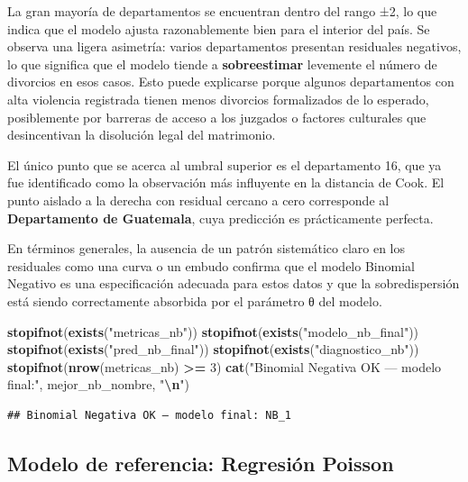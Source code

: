 \documentclass[
]{article}
\newenvironment{Shaded}{\begin{snugshade}}{\end{snugshade}}
\newcommand{\DecValTok}[1]{\textcolor[rgb]{0.00,0.00,0.81}{#1}}
\newcommand{\FunctionTok}[1]{\textcolor[rgb]{0.13,0.29,0.53}{\textbf{#1}}}
\newcommand{\NormalTok}[1]{#1}
\newcommand{\SpecialCharTok}[1]{\textcolor[rgb]{0.81,0.36,0.00}{\textbf{#1}}}
\newcommand{\StringTok}[1]{\textcolor[rgb]{0.31,0.60,0.02}{#1}}
\begin{document}
La gran mayoría de departamentos se encuentran dentro del rango ±2, lo
que indica que el modelo ajusta razonablemente bien para el interior del
país. Se observa una ligera asimetría: varios departamentos presentan
residuales negativos, lo que significa que el modelo tiende a
\textbf{sobreestimar} levemente el número de divorcios en esos casos.
Esto puede explicarse porque algunos departamentos con alta violencia
registrada tienen menos divorcios formalizados de lo esperado,
posiblemente por barreras de acceso a los juzgados o factores culturales
que desincentivan la disolución legal del matrimonio.

El único punto que se acerca al umbral superior es el departamento 16,
que ya fue identificado como la observación más influyente en la
distancia de Cook. El punto aislado a la derecha con residual cercano a
cero corresponde al \textbf{Departamento de Guatemala}, cuya predicción
es prácticamente perfecta.

En términos generales, la ausencia de un patrón sistemático claro en los
residuales como una curva o un embudo confirma que el modelo Binomial
Negativo es una especificación adecuada para estos datos y que la
sobredispersión está siendo correctamente absorbida por el parámetro θ
del modelo.

\begin{Shaded}
\begin{Highlighting}[]
\FunctionTok{stopifnot}\NormalTok{(}\FunctionTok{exists}\NormalTok{(}\StringTok{"metricas\_nb"}\NormalTok{))}
\FunctionTok{stopifnot}\NormalTok{(}\FunctionTok{exists}\NormalTok{(}\StringTok{"modelo\_nb\_final"}\NormalTok{))}
\FunctionTok{stopifnot}\NormalTok{(}\FunctionTok{exists}\NormalTok{(}\StringTok{"pred\_nb\_final"}\NormalTok{))}
\FunctionTok{stopifnot}\NormalTok{(}\FunctionTok{exists}\NormalTok{(}\StringTok{"diagnostico\_nb"}\NormalTok{))}
\FunctionTok{stopifnot}\NormalTok{(}\FunctionTok{nrow}\NormalTok{(metricas\_nb) }\SpecialCharTok{\textgreater{}=} \DecValTok{3}\NormalTok{)}
\FunctionTok{cat}\NormalTok{(}\StringTok{"Binomial Negativa OK — modelo final:"}\NormalTok{, mejor\_nb\_nombre, }\StringTok{"}\SpecialCharTok{\textbackslash{}n}\StringTok{"}\NormalTok{)}
\end{Highlighting}
\end{Shaded}

\begin{verbatim}
## Binomial Negativa OK — modelo final: NB_1
\end{verbatim}

\hypertarget{modelo-de-referencia-regresiuxf3n-poisson}{%
\subsection{Modelo de referencia: Regresión
Poisson}\label{modelo-de-referencia-regresiuxf3n-poisson}}
\end{document}
